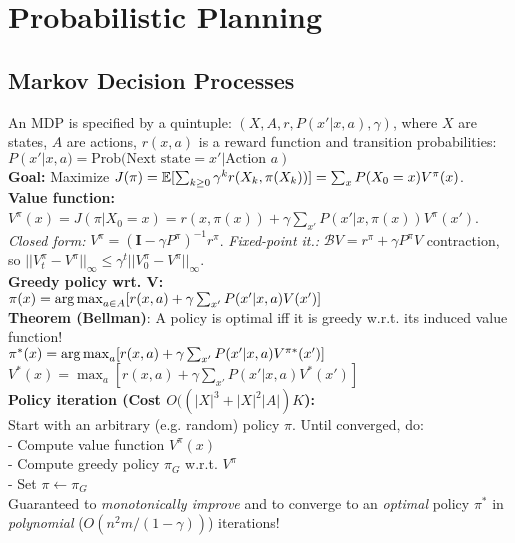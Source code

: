\section{Probabilistic Planning}
\subsection{Markov Decision Processes}
An MDP is specified by a quintuple: $(X, A, r, P(x'|x, a), \gamma)$, where $X$ are states, $A$ are actions, $r(x,a)$ is a reward function and transition probabilities:\\
    $P(x'|x,a)=\text{Prob(Next state}=x'|\text{Action } a)$\\ 
\textbf{Goal:} Maximize $J(\pi) = \mathbb{E}[\sum_{k\geq0} \gamma^k r(X_k, \pi(X_k))] = \sum_{x}P(X_0=x)V^\pi(x)$.\\
\textbf{Value function:} $V^\pi(x) = J(\pi|X_0=x) = r(x,\pi(x)) + \gamma\sum_{x'} P(x'|x,\pi(x))V^\pi(x')$.\\
\emph{Closed form:} $V^{\pi} = (\mathbf{I}-\gamma P^\pi)^{-1}r^\pi$. \emph{Fixed-point it.:} $\mathcal{B}V = r^\pi+\gamma P^\pi V$ contraction, so $||V_t^\pi-V^\pi||_\infty \leq \gamma^t||V_0^\pi-V^\pi||_\infty$.\\
\textbf{Greedy policy wrt. V:}\\
$\pi(x)=\operatorname*{arg\,max}_{a\in A} [r(x,a)+\gamma \sum_{x'}P(x'|x,a)V(x')]$\\
\textbf{Theorem (Bellman)}: A policy is optimal iff it is greedy w.r.t. its induced value function!\\
\mbox{$\pi^*(x)={\operatorname*{arg\,max}_{a}} [r(x,a)+\gamma \sum_{x'}P(x'|x,a)V^{\pi*}(x')]$}\\
$V^*(x)=\max_a[r(x,a)+\gamma \sum_{x'}P(x'|x,a)V^*(x')]$\\


\textbf{Policy iteration (Cost $O((|X|^3+|X|^2|A|)K$):}\\
Start with an arbitrary (e.g. random) policy $\pi$.
Until converged, do:\\
- Compute value function $V^\pi (x)$\\
- Compute greedy policy $\pi_G$ w.r.t. $V^\pi$\\
- Set $\pi \leftarrow \pi_G$\\
Guaranteed to \emph{monotonically improve} and to converge to an \emph{optimal} policy $\pi^*$ in \emph{polynomial} ($O(n^2m/(1-\gamma))$) iterations!

